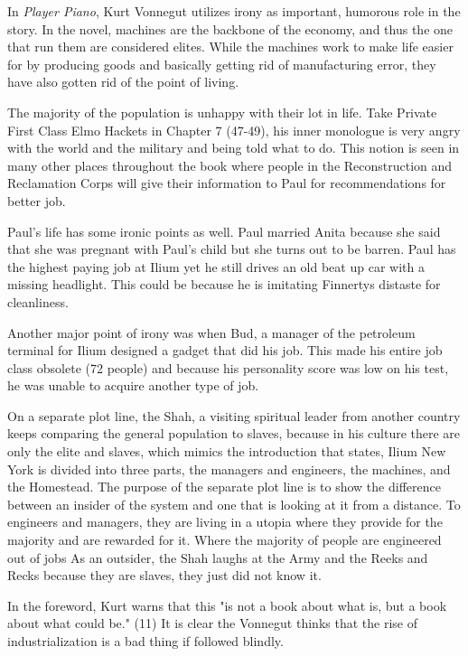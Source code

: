 In {\it Player Piano}, Kurt Vonnegut utilizes irony as important, humorous role in the story.
In the novel, machines are the backbone of the economy, and thus the one that run them are considered elites.
While the machines work to make life easier for by producing goods and basically getting rid of manufacturing error, they have also gotten rid of the point of living.

The majority of the population is unhappy with their lot in life.
Take Private First Class Elmo Hackets in Chapter 7 \autocite{chapter7}(47-49), his inner monologue is very angry with the world and the military and being told what to do.
This notion is seen in many other places throughout the book where people in the Reconstruction and Reclamation Corps will give their information to Paul for recommendations for better job.

Paul's life has some ironic points as well. Paul married Anita because she said that she was pregnant with Paul's child but she turns out to be barren.
Paul has the highest paying job at Ilium yet he still drives an old beat up car with a missing headlight. This could be because he is imitating Finnertys distaste for cleanliness.

Another major point of irony was when Bud, a manager of the petroleum terminal for Ilium designed a gadget that did his job.
This made his entire job class obsolete (72 people) and because his personality score was low on his test, he was unable to acquire another type of job.

On a separate plot line, the Shah, a visiting spiritual leader from another country keeps comparing the general population to slaves, because in his culture there are only the elite and slaves, which mimics the introduction that states, Ilium New York is divided into three parts, the managers and engineers, the machines, and the Homestead.
The purpose of the separate plot line is to show the difference between an insider of the system and one that is looking at it from a distance.
To engineers and managers, they are living in a utopia where they provide for the majority and are rewarded for it.
Where the majority of people are engineered out of jobs
As an outsider, the Shah laughs at the Army and the Reeks and Recks because they are slaves, they just did not know it.

In the foreword, Kurt warns that this "is not a book about what is, but a book about what could be." \autocite{foreword}(11)
It is clear the Vonnegut thinks that the rise of industrialization is a bad thing if followed blindly.